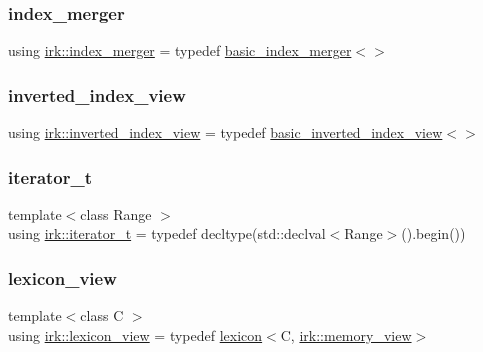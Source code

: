 \subsubsection{\texorpdfstring{index\+\_\+merger}{index\_merger}}
{\footnotesize\ttfamily using \mbox{\hyperlink{namespaceirk_abf02801860e10848db8a39845005f0c4}{irk\+::index\+\_\+merger}} = typedef \mbox{\hyperlink{classirk_1_1basic__index__merger}{basic\+\_\+index\+\_\+merger}}$<$$>$}

\mbox{\label{namespaceirk_a137711df98ba695c3526ba4004853a47}} 
\subsubsection{\texorpdfstring{inverted\+\_\+index\+\_\+view}{inverted\_index\_view}}
{\footnotesize\ttfamily using \mbox{\hyperlink{namespaceirk_a137711df98ba695c3526ba4004853a47}{irk\+::inverted\+\_\+index\+\_\+view}} = typedef \mbox{\hyperlink{classirk_1_1basic__inverted__index__view}{basic\+\_\+inverted\+\_\+index\+\_\+view}}$<$$>$}

\mbox{\label{namespaceirk_a333e3104afd57c79fb0c18b90081520a}} 
\subsubsection{\texorpdfstring{iterator\+\_\+t}{iterator\_t}}
{\footnotesize\ttfamily template$<$class Range $>$ \\
using \mbox{\hyperlink{namespaceirk_a333e3104afd57c79fb0c18b90081520a}{irk\+::iterator\+\_\+t}} = typedef decltype(std\+::declval$<$Range$>$().begin())}

\mbox{\label{namespaceirk_ab1814afdb97c1b326d1d549beedf9be8}} 
\subsubsection{\texorpdfstring{lexicon\+\_\+view}{lexicon\_view}}
{\footnotesize\ttfamily template$<$class C $>$ \\
using \mbox{\hyperlink{namespaceirk_ab1814afdb97c1b326d1d549beedf9be8}{irk\+::lexicon\+\_\+view}} = typedef \mbox{\hyperlink{classirk_1_1lexicon}{lexicon}}$<$C, \mbox{\hyperlink{classirk_1_1memory__view}{irk\+::memory\+\_\+view}}$>$}

